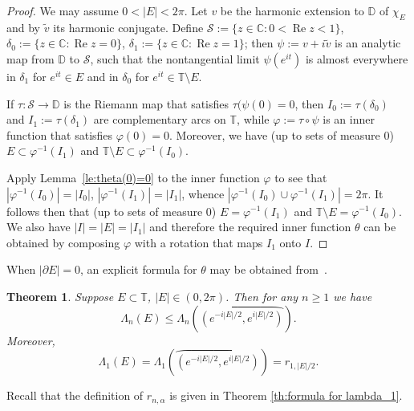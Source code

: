 \documentclass[11pt,reqno]{amsart}
\numberwithin{equation}{section}
\theoremstyle{plain}
\newtheorem{Theorem}[equation]{Theorem}
\theoremstyle{definition}
\begin{document}
\begin{proof} We may assume $0<|E|<2\pi$.
Let $v$ be the harmonic extension to ${ \mathbb{D}}$ of $\chi_E$ and by $\tilde v$ its harmonic conjugate. Define ${\mathcal{S}}:=\{z\in{ \mathbb{C}}:0<{\operatorname{Re}z}<1\}$, $\delta_0:=\{z\in{ \mathbb{C}}:{\operatorname{Re}z}=0\}$, $\delta_1:=\{z\in{ \mathbb{C}}:{\operatorname{Re}z}=1\}$; then $\psi:=v+i\tilde v$ is an analytic map from ${ \mathbb{D}}$ to ${\mathcal{S}}$, such that the nontangential limit
$\psi(e^{it})$ is almost everywhere in $\delta_1$ for $e^{it}\in E$ and in $\delta_0$ for $e^{it}\in {\mathbb{T}}\setminus E$.

If $\tau:{\mathcal{S}}\to { \mathbb{D}}$ is the Riemann  map that satisfies $\tau(\psi(0)=0$, then $I_0:=\tau(\delta_0)$ and $I_1:=\tau(\delta_1)$ are complementary arcs on ${\mathbb{T}}$, while ${\varphi}:=\tau\circ \psi$ is an inner function that satisfies ${\varphi}(0)=0$. Moreover, we have (up to sets of measure 0) $E\subset{\varphi}^{-1}(I_1)$ and ${\mathbb{T}}\setminus E\subset{\varphi}^{-1}(I_0) $. 

Apply Lemma~\ref{le:theta(0)=0}  to the inner function ${\varphi}$ to see that $|{\varphi}^{-1}(I_0)|=|I_0|$, $|{\varphi}^{-1}(I_1)|=|I_1|$, whence $|{\varphi}^{-1}(I_0)\cup{\varphi}^{-1}(I_1)|=2\pi$. It follows then that (up to sets of measure 0) $E={\varphi}^{-1}(I_1)$ and ${\mathbb{T}}\setminus E={\varphi}^{-1}(I_0) $. We also have $|I|=|E|=|I_1|$ and therefore the required inner function $\theta$ can be obtained by composing ${\varphi}$ with a rotation that maps $I_1$ onto $I$.
\end{proof}

When $|\partial E|=0$, an explicit formula for $\theta$ may be obtained from~\cite[Proposition 2.1]{BT}.

\begin{Theorem}\label{th:general sets}
Suppose $E\subset{\mathbb{T}}$, $|E| \in (0, 2 \pi)$. 
Then for any $n \geq 1$ we have
\[
\Lambda_n(E)\le \Lambda_n( \wideparen{(e^{-i |E|/2}, e^{i |E|/2})}).
\]
Moreover, 
$$\Lambda_1(E)= \Lambda_1(\wideparen{(e^{-i |E|/2}, e^{i |E|/2})})=r_{1,|E|/2}.$$
\end{Theorem}

Recall that the definition of $r_{n, \alpha}$ is given in Theorem \ref{th:formula for lambda_1}.
\end{document}
